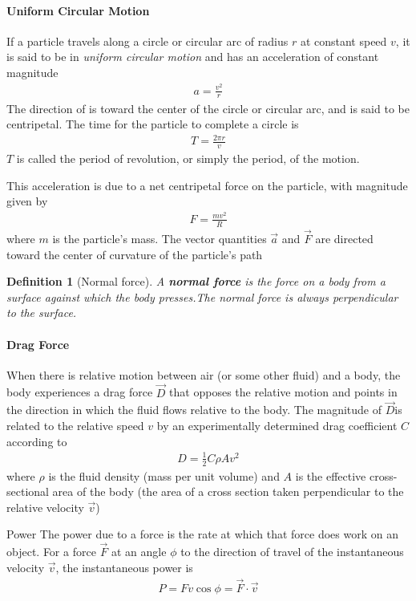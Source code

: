 \documentclass{article}
\numberwithin{equation}{subsection} %
\newtheorem{defi}{Definition}[section]
\theoremstyle{definition}
\begin{document}
\paragraph{Uniform Circular Motion} If a particle travels along a circle
or circular arc of radius $r$ at constant speed $v$, it is said to be in
\textit{uniform circular motion} and has an acceleration of constant
magnitude
\begin{align}
    a = \frac{v^2}{r}
\end{align}
The direction of is toward the center of the circle or circular arc,
and is said to be centripetal. The time for the particle to complete
a circle is
\begin{align}
    T=\frac{2\pi r}{v}
\end{align}
$T$ is called the period of revolution, or simply the period, of the
motion.

This acceleration is due to a net centripetal force on the particle,
with magnitude given by
\begin{align}
    F = \frac{mv^2}{R}
\end{align}
where $m$ is the particle’s mass. The vector quantities $\vec a$ and
$\vec F$ are directed toward the center of curvature of the particle’s
path
\begin{defi}[Normal force]
A \textbf{normal force} is the force on a body from a surface against
which the body presses.The normal force is always perpendicular to the
surface.
\end{defi}

\paragraph{Drag Force} When there is relative motion between air (or
some other fluid) and a body, the body experiences a drag force $\vec
D$
that opposes the relative motion and points in the direction in
which the fluid flows relative to the body. The magnitude of $\vec D$is
related to the relative speed $v$ by an experimentally determined
drag coefficient $C$ according to
\begin{align}
    D=\frac{1}{2} C\rho A v^2
\end{align}
where $\rho$ is the fluid density (mass per unit volume) and $A$ is
the effective cross-sectional area of the body (the area of a cross
section taken perpendicular to the relative velocity $\vec v$)

Power The power due to a force is the rate at which that force
does work on an object. For a force $\vec F$ at an angle $\phi$ to the
direction of travel of the instantaneous velocity $\vec v$, the
instantaneous power is
\begin{align}
    P = Fv \cos{\phi} = \vec{F} \cdot \vec{v}
\end{align}
\end{document}
